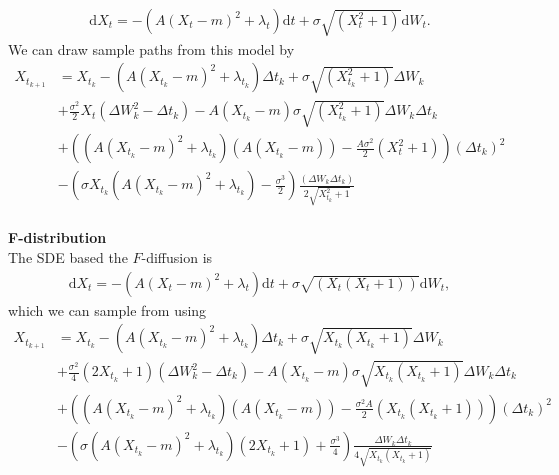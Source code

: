 \begin{align}
    \mathrm{d}X_t = -\left(A(X_t - m)^2 + \lambda_t\right)\mathrm{d}t + \sigma \sqrt{\left(X_t^2 + 1\right)}\mathrm{d}W_t.
\end{align}
We can draw sample paths from this model by
\begin{align}
    X_{t_{k + 1}} &= X_{t_k} - \left(A(X_{t_k} - m)^2 + \lambda_{t_k}\right) \Delta t_k + \sigma \sqrt{\left(X_{t_k}^2 + 1\right)} \Delta W_{k} \nonumber\\
    &+ \frac{\sigma^2}{2}X_t \left(\Delta W_{k}^2 - \Delta t_k\right) - A\left(X_{t_k} - m \right)\sigma\sqrt{\left(X_{t_k}^2 + 1\right)}\Delta W_{k}\Delta t_k \nonumber\\
    &+ \left(\left(A\left(X_{t_k} - m \right)^2+\lambda_{t_k}\right)\left(A\left(X_{t_k} - m \right)\right) - \frac{A\sigma^2}{2}\left(X_t^2 + 1\right)\right)\left(\Delta t_k\right)^2 \nonumber\\
    &-\left(\sigma X_{t_k}\left(A\left(X_{t_k} - m \right)^2 + \lambda_{t_k}\right) - \frac{\sigma^3}{2}\right)\frac{\left(\Delta W_{k}\Delta t_k\right)}{2\sqrt{X_{t_k}^2 + 1}} \label{eq:skew_t_sim}
\end{align} 
\\
\textbf{F-distribution}\\
The SDE based the $F$-diffusion is
\begin{align}
    \mathrm{d}X_t = -\left(A(X_t - m)^2 + \lambda_t\right)\mathrm{d}t + \sigma \sqrt{\left(X_t\left(X_t + 1\right)\right)}\mathrm{d}W_t,
\end{align}
which we can sample from using
\begin{align}
    X_{t_{k + 1}} &= X_{t_k} - \left(A(X_{t_k} - m)^2 + \lambda_{t_k}\right) \Delta t_k + \sigma\sqrt{X_{t_k}\left(X_{t_k} + 1\right)}\Delta W_k \nonumber \\
    &+ \frac{\sigma^2}{4}\left(2X_{t_k} + 1\right)\left(\Delta W_k^2 - \Delta t_k\right) - A \left(X_{t_k} - m\right)\sigma \sqrt{X_{t_k}\left(X_{t_k} + 1\right)}\Delta W_k \Delta t_k \nonumber \\
    &+ \left(\left(A\left(X_{t_k} - m\right)^2 + \lambda_{t_k}\right)\left(A\left(X_{t_k} - m\right)\right) - \frac{\sigma^2A}{2}\left(X_{t_k}\left(X_{t_k} + 1\right)\right)  \right)\left(\Delta t_k\right)^2 \nonumber \\
    &- \left(\sigma\left(A\left(X_{t_k} - m\right)^2 + \lambda_{t_k}\right)\left(2 X_{t_k} + 1\right) + \frac{\sigma^3}{4}\right)\frac{\Delta W_k \Delta t_k}{4\sqrt{X_{t_k}\left(X_{t_k} + 1\right)}}
\end{align}
